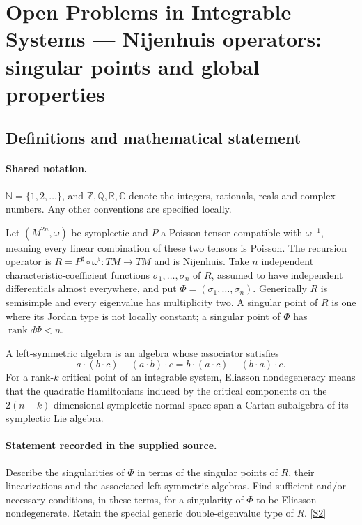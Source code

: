 \documentclass[11pt]{article}
\newcommand{\sref}[2]{\hyperlink{source:#1:#2}{[S#2]}}
\begin{document}
\section{Open Problems in Integrable Systems — Nijenhuis operators: singular points and global properties}\label{statement}

\subsection{Definitions and mathematical statement}

\paragraph{Shared notation.}$\mathbb N=\{1,2,\ldots\}$, and $\mathbb Z,\mathbb Q,\mathbb R,\mathbb C$ denote the integers, rationals, reals and complex numbers. Any other conventions are specified locally.


Let $(M^{2n},\omega)$ be symplectic and $P$ a Poisson tensor compatible with $\omega^{-1}$, meaning every linear combination of these two tensors is Poisson. The recursion operator is $R=P^{\sharp}\circ\omega^{\flat}:TM\to TM$ and is Nijenhuis. Take $n$ independent characteristic-coefficient functions $\sigma_1,\ldots,\sigma_n$ of $R$, assumed to have independent differentials almost everywhere, and put $\Phi=(\sigma_1,\ldots,\sigma_n)$. Generically $R$ is semisimple and every eigenvalue has multiplicity two. A singular point of $R$ is one where its Jordan type is not locally constant; a singular point of $\Phi$ has $\operatorname{rank}d\Phi<n$.\par A left-symmetric algebra is an algebra whose associator satisfies
\[a\cdot(b\cdot c)-(a\cdot b)\cdot c=b\cdot(a\cdot c)-(b\cdot a)\cdot c.\]
For a rank-$k$ critical point of an integrable system, Eliasson nondegeneracy means that the quadratic Hamiltonians induced by the critical components on the $2(n-k)$-dimensional symplectic normal space span a Cartan subalgebra of its symplectic Lie algebra.
\paragraph{Statement recorded in the supplied source.}
Describe the singularities of $\Phi$ in terms of the singular points of $R$, their linearizations and the associated left-symmetric algebras. Find sufficient and/or necessary conditions, in these terms, for a singularity of $\Phi$ to be Eliasson nondegenerate. Retain the special generic double-eigenvalue type of $R$. \sref{statement}{2}
\end{document}
